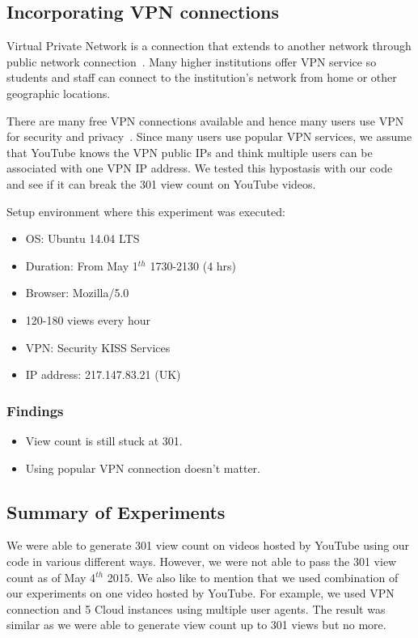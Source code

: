 \documentclass[conference]{IEEEtran}
\begin{document}
\subsection{Incorporating VPN connections}

Virtual Private Network is a connection that extends to another network through public network connection~\cite{c23}. Many higher institutions offer VPN service so students and staff can connect to the institution’s network from home or other geographic locations.

There are many free VPN connections available and hence many users use VPN for security and privacy~\cite{c24}. Since many users use popular VPN services, we assume that YouTube knows the VPN public IPs and think multiple users can be associated with one VPN IP address. We tested this hypostasis with our code and see if it can break the 301 view count on YouTube videos.

Setup environment where this experiment was executed:
\begin{itemize}
  \setlength\itemsep{-0.1em}
  \item OS: Ubuntu 14.04 LTS
  \item Duration: From May 1$^{th}$ 1730-2130 (4 hrs)
  \item Browser: Mozilla/5.0
  \item 120-180 views every hour
  \item VPN: Security KISS Services
  \item IP address: 217.147.83.21 (UK)
\end{itemize}

\subsubsection*{Findings}
\begin{itemize}
  \setlength\itemsep{-0.1em}
  \item View count is still stuck at 301.
  \item Using popular VPN connection doesn't matter.
\end{itemize}

\subsection{Summary of Experiments}

We were able to generate 301 view count on videos hosted by YouTube using our code in various different ways. However, we were not able to pass the 301 view count as of May 4$^{th}$ 2015. We also like to mention that we used combination of our experiments on one video hosted by YouTube. For example, we used VPN connection and 5 Cloud instances using multiple user agents. The result was similar as we were able to generate view count up to 301 views but no more.
\end{document}
